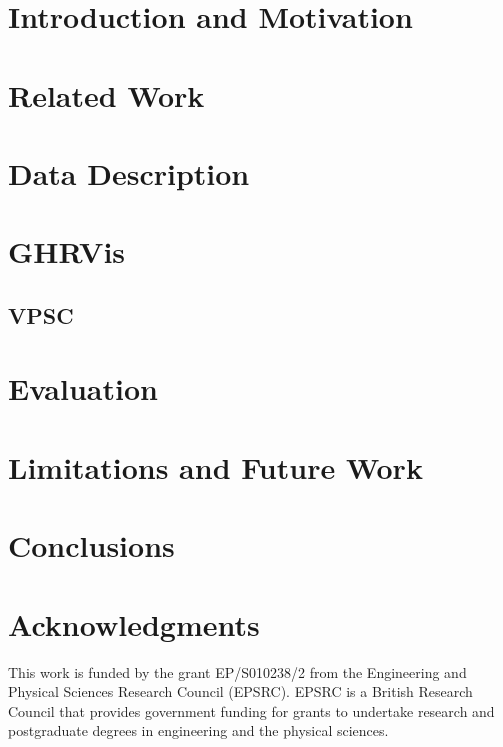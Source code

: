 \documentclass{egpubl}
\begin{document}
\begin{abstract}

\end{abstract}

\section{Introduction and Motivation}

\section{Related Work}

\section{Data Description}

\section{GHRVis}

\subsection{VPSC}

\section{Evaluation}

\section{Limitations and Future Work}

\section{Conclusions}


\section{Acknowledgments}
This work is funded by the grant EP/S010238/2 from the Engineering and Physical Sciences Research Council (EPSRC). EPSRC is a British Research Council that provides government funding for grants to undertake research and postgraduate degrees in engineering and the physical sciences. 

\let\section=\origsection
\printbibliography
\end{document}
